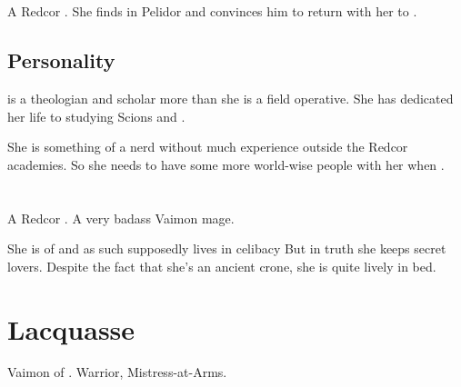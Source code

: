 \section{\Chyrie \Esmerel}
\index{\ChyrieEsmerel}
\index{\Esmerel!\Chyrie}
A Redcor \Matron{}. She finds  in Pelidor and convinces him to return with her to \Redce.









\subsection{Personality}
\Esmerel{} is a theologian and scholar more than she is a field operative. 
She has dedicated her life to studying Scions and \Malachim. 

She is something of a nerd without much experience outside the Redcor academies. 
So she needs to have some more world-wise people with her when \travelling. 















\section{\Dominice}
A Redcor \Matriarch. A very badass Vaimon mage. 

She is of \theTulipFaction{} and as such supposedly lives in celibacy
But in truth she keeps secret lovers. 
Despite the fact that she's an ancient crone, she is quite lively in bed.















\section{\Laetitia Lacquasse}
Vaimon of \ClanRedcor. Warrior, Mistress-at-Arms. 


